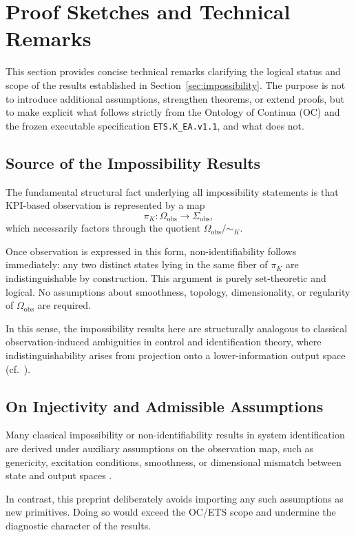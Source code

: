 ﻿\section{Proof Sketches and Technical Remarks}
\label{sec:proof-sketches}

This section provides concise technical remarks clarifying the logical status
and scope of the results established in
Section~\ref{sec:impossibility}.
The purpose is not to introduce additional assumptions, strengthen theorems, or
extend proofs, but to make explicit what follows strictly from the Ontology of
Continua (OC) and the frozen executable specification
\texttt{ETS.K\_EA.v1.1}, and what does not.

\subsection{Source of the Impossibility Results}

The fundamental structural fact underlying all impossibility statements is that
KPI-based observation is represented by a map
\[
\pi_K:\Omega_{\mathrm{obs}}\to\Sigma_{\mathrm{obs}},
\]
which necessarily factors through the quotient
\(\Omega_{\mathrm{obs}}/\!\sim_K\).

Once observation is expressed in this form, non-identifiability follows
immediately: any two distinct states lying in the same fiber of \(\pi_K\) are
indistinguishable by construction.
This argument is purely set-theoretic and logical.
No assumptions about smoothness, topology, dimensionality, or regularity of
\(\Omega_{\mathrm{obs}}\) are required.

In this sense, the impossibility results here are structurally analogous to
classical observation-induced ambiguities in control and identification theory,
where indistinguishability arises from projection onto a lower-information
output space (cf.\ \cite{kalman1960,ljung1999}).

\subsection{On Injectivity and Admissible Assumptions}

Many classical impossibility or non-identifiability results in system
identification are derived under auxiliary assumptions on the observation map,
such as genericity, excitation conditions, smoothness, or dimensional mismatch
between state and output spaces \cite{ljung1999,walter1997}.

In contrast, this preprint deliberately avoids importing any such assumptions as
new primitives.
Doing so would exceed the OC/ETS scope and undermine the diagnostic character of
the results.

